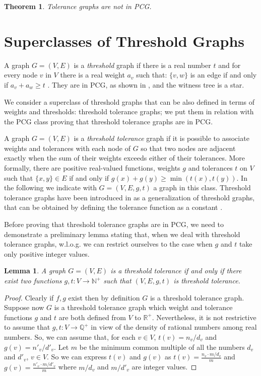 \documentclass{elsarticle}
\newtheorem{theorem}{Theorem}
\newtheorem{lemma}{Lemma}
\begin{document}
\begin{doublespace}
\begin{theorem} 
Tolerance graphs are not in PCG.
\end{theorem}

\section{Superclasses of Threshold Graphs}

A graph $G=(V,E)$ is a \emph{threshold} graph  if there is a real number $t$  and for every node $v$ in $V$ there is a real weight $a_v$ such that: $\{v,w\}$ is an edge if and only if  $a_v + a_w \geq  t$ \cite{MRT88,MP95}. They are in PCG, as shown in \cite{CPS13}, and the witness tree is a star.

We consider a superclass of threshold graphs that can be also defined in terms of weights and thresholds: threshold tolerance graphs; we put them in relation with the PCG class proving that threshold tolerance graphs are in PCG.

A graph $G=(V,E)$ is a \emph{threshold tolerance} graph if it is possible to associate weights and tolerances with each node of $G$ so that two nodes are adjacent exactly when the sum of their weights exceeds either of their tolerances.
More formally, there are positive real-valued functions, weights $g$ and tolerances $t$ on $V$ such that $\{x, y\} \in E$  if and only if $g(x)+g(y) \geq  \min{(t(x), t(y))}$.
In the following we  indicate with $G=(V,E, g, t)$ a graph in this class.
Threshold tolerance graphs have been introduced in \cite{MRT86} as a generalization of threshold graphs, that can be obtained by defining the tolerance function as a constant \cite{MRT88}. 

Before proving that threshold tolerance graphs are in PCG, we need to demonstrate a preliminary lemma stating that, when we deal with threshold tolerance graphs, w.l.o.g. we can restrict ourselves to the case when $g$ and $t$ take only positive integer values.

\begin{lemma}
\label{lemma.int}
A graph $G=(V,E)$ is a threshold tolerance if and only if there exist two functions $g,t:V\rightarrow  \mathbb{N}^+$ such that $(V,E,g,t)$ is threshold tolerance.
\end{lemma}

\begin{proof}
Clearly if $f,g$ exist then by definition $G$ is a threshold tolerance graph. Suppose now $G$ is a threshold tolerance graph which weight and tolerance functions $g$ and $t$ are both defined from $V$ to $\mathbb{R}^+$. 
Nevertheless, it is not restrictive to assume that $g,t: V \rightarrow \mathbb{Q}^+$ in view of the density of rational numbers among real numbers.
So, we can assume that, for each $v \in V$, $t(v)=n_v / d_v$ and $g(v)=n'_v / d'_v$.
Let $m$ be the minimum common multiple of all the numbers $d_v$ and $d'_v$, $v \in V$. 
So we can express $t(v)$ and $g(v)$ as $t(v)=\frac{n_v \cdot m/d_v}{m}$ and 
$g(v)=\frac{n'_v \cdot m/d'_v}{m}$ where $m/d_v$ and $m/d'_v$ are integer values.


\end{proof}
\end{doublespace}
\end{document}
